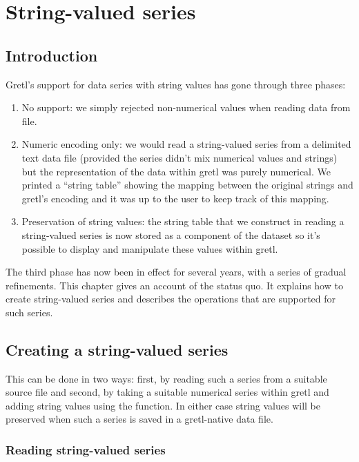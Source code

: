 \chapter{String-valued series}
\label{chap:strval-series}

\section{Introduction}

Gretl's support for data series with string values has gone through
three phases:
\begin{enumerate}
\item No support: we simply rejected non-numerical values when reading
  data from file.
\item Numeric encoding only: we would read a string-valued series from
  a delimited text data file (provided the series didn't mix numerical
  values and strings) but the representation of the data within gretl
  was purely numerical. We printed a ``string table'' showing the
  mapping between the original strings and gretl's encoding and it was
  up to the user to keep track of this mapping.
\item Preservation of string values: the string table that we
  construct in reading a string-valued series is now stored as a
  component of the dataset so it's possible to display and manipulate
  these values within gretl.
\end{enumerate}

The third phase has now been in effect for several years, with a
series of gradual refinements. This chapter gives an account of the
status quo. It explains how to create string-valued series and
describes the operations that are supported for such series.

\section{Creating a string-valued series}

This can be done in two ways: first, by reading such a series from a
suitable source file and second, by taking a suitable numerical series
within gretl and adding string values using the 
function. In either case string values will be preserved when such
a series is saved in a gretl-native data file.

\subsection{Reading string-valued series}
\label{sec:reading}


